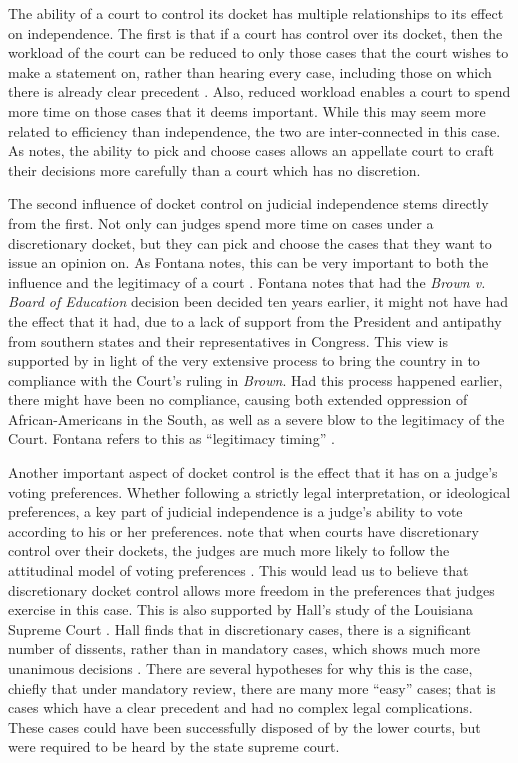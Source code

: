 \documentclass[12pt]{article}
\begin{document}
The ability of a court to control its docket has multiple relationships to its effect on independence.  The first is that if a court has control over its docket, then the workload of the court can be reduced to only those cases that the court wishes to make a statement on, rather than hearing every case, including those on which there is already clear precedent \citep{Maltzman2000}.  Also, reduced workload enables a court to spend more time on those cases that it deems important.  While this may seem more related to efficiency than independence, the two are inter-connected in this case.  As \citet{Squire2008} notes, the ability to pick and choose cases allows an appellate court to craft their decisions more carefully than a court which has no discretion.

The second influence of docket control on judicial independence stems directly from the first.  Not only can judges spend more time on cases under a discretionary docket, but they can pick and choose the cases that they want to issue an opinion on.  As Fontana notes, this can be very important to both the influence and the legitimacy of a court \citep{Fontana2011}.  Fontana notes that had the \textit{Brown v. Board of Education} decision been decided ten years earlier, it might not have had the effect that it had, due to a lack of support from the President and antipathy from southern states and their representatives in Congress.  This view is supported by \citet{Rosenberg1991} in light of the very extensive process to bring the country in to compliance with the Court's ruling in \textit{Brown}.  Had this process happened earlier, there might have been no compliance, causing both extended oppression of African-Americans in the South, as well as a severe blow to the legitimacy of the Court.  Fontana refers to this as ``legitimacy timing'' \citep[627]{Fontana2011}.  

Another important aspect of docket control is the effect that it has on a judge's voting preferences.  Whether following a strictly legal interpretation, or ideological preferences, a key part of judicial independence is a judge's ability to vote according to his or her preferences.  \citeauthor{Songer2003} note that when courts have discretionary control over their dockets, the judges are much more likely to follow the attitudinal model of voting preferences \citep{Songer2003}.  This would lead us to believe that discretionary docket control allows more freedom in the preferences that judges exercise in this case.   This is also supported by Hall's study of the Louisiana Supreme Court \citep{Hall1987a,Hall1987b}.  Hall finds that in discretionary cases, there is a significant number of dissents, rather than in mandatory cases, which shows much more unanimous decisions \citep{Hall1985}.  There are several hypotheses for why this is the case, chiefly that under mandatory review, there are many more ``easy'' cases; that is cases which have a clear precedent and had no complex legal complications.  These cases could have been successfully disposed of by the lower courts, but were required to be heard by the state supreme court.   
\end{document}
